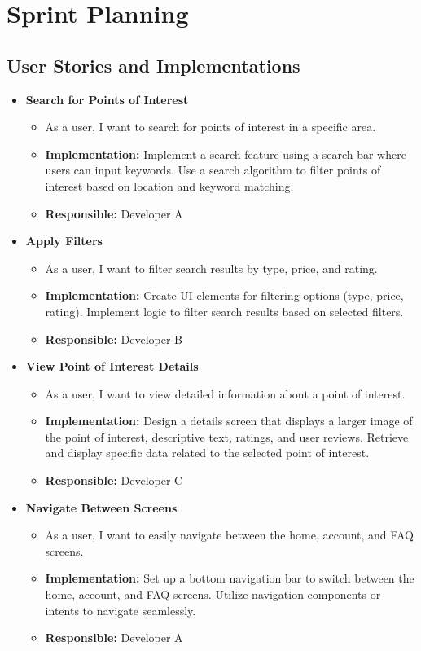 \chapter{Sprint Planning}

\section*{User Stories and Implementations}

\begin{itemize}
	\item \textbf{Search for Points of Interest}
	\begin{itemize}
		\item As a user, I want to search for points of interest in a specific area.
		\item \textbf{Implementation:} Implement a search feature using a search bar where users can input keywords. Use a search algorithm to filter points of interest based on location and keyword matching.
		\item \textbf{Responsible:} Developer A
	\end{itemize}
	
	\item \textbf{Apply Filters}
	\begin{itemize}
		\item As a user, I want to filter search results by type, price, and rating.
		\item \textbf{Implementation:} Create UI elements for filtering options (type, price, rating). Implement logic to filter search results based on selected filters.
		\item \textbf{Responsible:} Developer B
	\end{itemize}
	
	\item \textbf{View Point of Interest Details}
	\begin{itemize}
		\item As a user, I want to view detailed information about a point of interest.
		\item \textbf{Implementation:} Design a details screen that displays a larger image of the point of interest, descriptive text, ratings, and user reviews. Retrieve and display specific data related to the selected point of interest.
		\item \textbf{Responsible:} Developer C
	\end{itemize}
	
	\item \textbf{Navigate Between Screens}
	\begin{itemize}
		\item As a user, I want to easily navigate between the home, account, and FAQ screens.
		\item \textbf{Implementation:} Set up a bottom navigation bar to switch between the home, account, and FAQ screens. Utilize navigation components or intents to navigate seamlessly.
		\item \textbf{Responsible:} Developer A
	\end{itemize}
	

\end{itemize}
